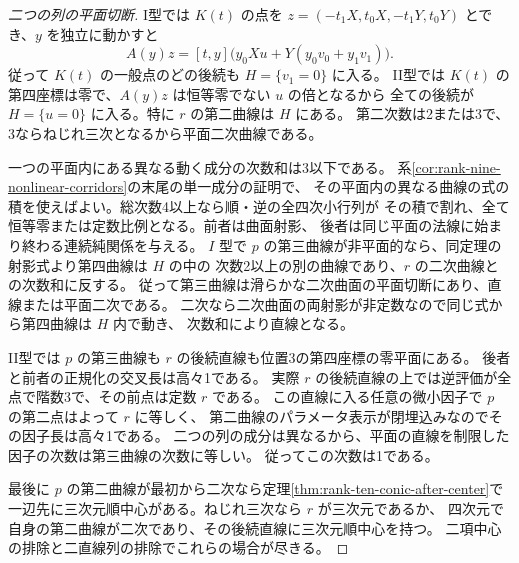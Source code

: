 \begin{proof}[二つの列の平面切断]
I型では $K(t)$ の点を
$z=(-t_1X,t_0X,-t_1Y,t_0Y)$ とでき、$y$ を独立に動かすと
\[
              A(y)z=[t,y]\big(y_0 X u+Y(y_0v_0+y_1v_1)\big).
\]
従って $K(t)$ の一般点のどの後続も $H=\{v_1=0\}$ に入る。
II型では $K(t)$ の第四座標は零で、$A(y)z$ は恒等零でない $u$ の倍となるから
全ての後続が $H=\{u=0\}$ に入る。特に $r$ の第二曲線は $H$ にある。
第二次数は2または3で、3ならねじれ三次となるから平面二次曲線である。

一つの平面内にある異なる動く成分の次数和は3以下である。
系\ref{cor:rank-nine-nonlinear-corridors}の末尾の単一成分の証明で、
その平面内の異なる曲線の式の積を使えばよい。総次数4以上なら順・逆の全四次小行列が
その積で割れ、全て恒等零または定数比例となる。前者は曲面射影、
後者は同じ平面の法線に始まり終わる連続純関係を与える。
$I$ 型で $p$ の第三曲線が非平面的なら、同定理の射影式より第四曲線は $H$ の中の
次数2以上の別の曲線であり、$r$ の二次曲線との次数和に反する。
従って第三曲線は滑らかな二次曲面の平面切断にあり、直線または平面二次である。
二次なら二次曲面の両射影が非定数なので同じ式から第四曲線は $H$ 内で動き、
次数和により直線となる。

II型では $p$ の第三曲線も $r$ の後続直線も位置3の第四座標の零平面にある。
後者と前者の正規化の交叉長は高々1である。
実際 $r$ の後続直線の上では逆評価が全点で階数3で、その前点は定数 $r$ である。
この直線に入る任意の微小因子で $p$ の第二点はよって $r$ に等しく、
第二曲線のパラメータ表示が閉埋込みなのでその因子長は高々1である。
二つの列の成分は異なるから、平面の直線を制限した因子の次数は第三曲線の次数に等しい。
従ってこの次数は1である。

最後に $p$ の第二曲線が最初から二次なら定理\ref{thm:rank-ten-conic-after-center}で
一辺先に三次元順中心がある。ねじれ三次なら $r$ が三次元であるか、
四次元で自身の第二曲線が二次であり、その後続直線に三次元順中心を持つ。
二項中心の排除と二直線列の排除でこれらの場合が尽きる。
\end{proof}
